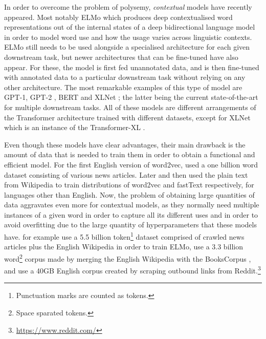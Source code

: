 In order to overcome the problem of polysemy, \emph{contextual} models have recently appeared. Most notably ELMo \citep{peters-etal-2018-deep} which produces deep contextualised word representations out of the internal states of a deep bidirectional language model in order to model word use and how the usage varies across linguistic contexts. ELMo still needs to be used alongside a specialised architecture for each given downstream task, but newer architectures that can be fine-tuned have also appear. For these, the model is first fed unannotated data, and is then fine-tuned with annotated data to a particular downstream task without relying on any other architecture. The most remarkable examples of this type of model are GPT-1, GPT-2 \citep{radford-etal-2018-improving,radford-etal-2019-language}, BERT \citep{devlin-etal-2019-bert} and XLNet \citep{yang-etal-2019-xlnet}; the latter being the current state-of-the-art for multiple downstream tasks. All of these models are different arrangements of the Transformer architecture \citep{vaswani-etal-2017-attention} trained with different datasets, except for XLNet which is an instance of the Transformer-XL \citep{dai-etal-2019-transformer}.

Even though these models have clear advantages, their main drawback is the amount of data that is needed to train them in order to obtain a functional and efficient model. For the first English version of word2vec, \citet{mikolov-etal-2013-distributed} used a one billion word dataset consisting of various news articles. Later \citet{al-rfou-etal-2013-polyglot} and then \citet{bojanowski-etal-2017-enriching} used the plain text from Wikipedia to train distributions of word2vec and fastText respectively, for languages other than English. Now, the problem of obtaining large quantities of data aggravates even more for contextual models, as they normally need multiple instances of a given word in order to capture all its different uses and in order to avoid overfitting due to the large quantity of hyperparameters that these models have. \citet{peters-etal-2018-deep} for example use a 5.5 billion token\footnote{Punctuation marks are counted as tokens.} dataset comprised of crawled news articles plus the English Wikipedia in order to train ELMo, \citet{devlin-etal-2019-bert} use a 3.3 billion word\footnote{Space sparated tokens.} corpus made by merging the English Wikipedia with the BooksCorpus \citep{zhu-etal-2015-aligning}, and \citet{radford-etal-2019-language} use a 40GB English corpus created by scraping outbound links from Reddit.\footnote{\url{https://www.reddit.com/}}

